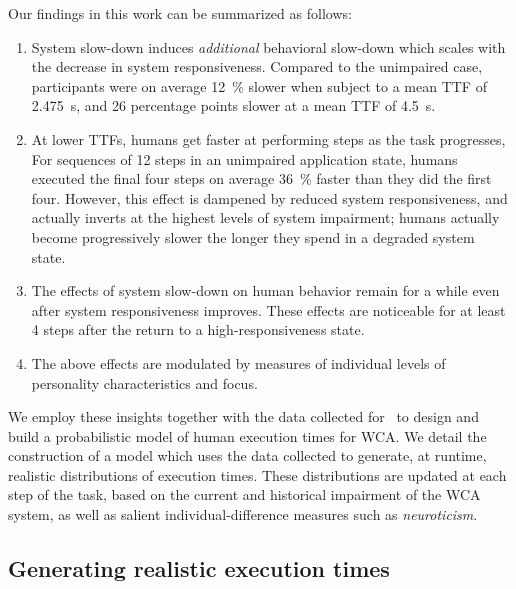Our findings in this work can be summarized as follows:
\begin{enumerate}
    \item System slow-down induces \emph{additional} behavioral slow-down which scales with the decrease in system responsiveness.
    Compared to the unimpaired case, participants were on average \SI{12}{\percent} slower when subject to a mean \gls{TTF} of \SI{2.475}{\second}, and \num{26} percentage points slower at a mean \gls{TTF} of \SI{4.5}{\second}.

    \item\label{item:speedup} At lower \glspl{TTF}, humans get faster at performing steps as the task progresses,
    For sequences of \num{12} steps in an unimpaired application state, humans executed the final four steps on average \SI{36}{\percent} faster than they did the first four.
    However, this effect is dampened by reduced system responsiveness, and actually inverts at the highest levels of system impairment;
    humans actually become progressively slower the longer they spend in a degraded system state.

    \item\label{item:remain} The effects of system slow-down on human behavior remain for a while even after system responsiveness improves.
    These effects are noticeable for at least \num{4} steps after the return to a high-responsiveness state. 
    
    \item The above effects are modulated by measures of individual levels of personality characteristics and focus.
\end{enumerate}

We employ these insights together with the data collected for~\cite{olguinmunoz2021impact} to design and build a probabilistic model of human execution times for \gls{WCA}.
We detail the construction of a model which uses the data collected to generate, at runtime, realistic distributions of execution times.
These distributions are updated at each step of the task, based on the current and historical impairment of the \gls{WCA} system, as well as salient individual-difference measures such as \emph{neuroticism}.

\subsection{Generating realistic execution times}\label{ssec:model:exectimes}

